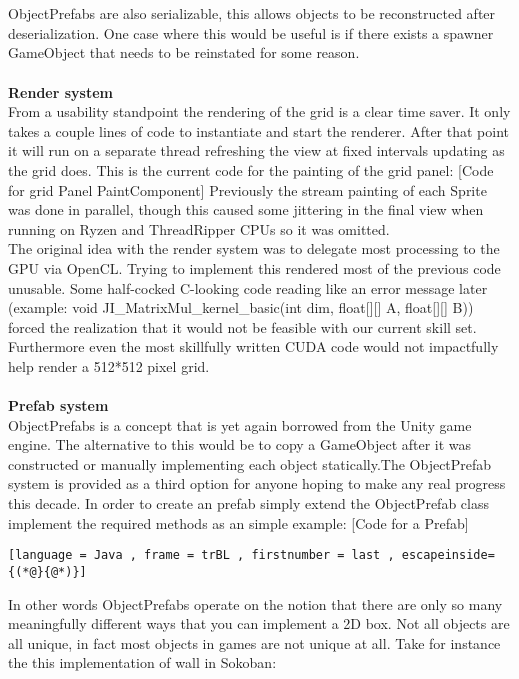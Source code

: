 \documentclass[main.tex]{subfiles}
\begin{document}
\\ \\
ObjectPrefabs are also serializable, this allows objects to be reconstructed after deserialization. One case where this would be useful is if there exists a spawner GameObject that needs to be reinstated for some reason. 
\\ \\
\textbf{Render system} \\%
From a usability standpoint the rendering of the grid is a clear time saver. It only takes a couple lines of code to instantiate and start the renderer. After that point it will run on a separate thread refreshing the view at fixed intervals updating as the grid does. This is the current code for the painting of the grid panel:
	[Code for grid Panel PaintComponent]
Previously the stream painting of each Sprite was done in parallel, though this caused some jittering in the final view when running on Ryzen and ThreadRipper CPUs so it was omitted.
\\
The original idea with the render system was to delegate most processing to the GPU via OpenCL. Trying to implement this rendered most of the previous code unusable. Some half-cocked C-looking code reading like an error message later (example: void JI\_MatrixMul\_kernel\_basic(int dim, float[][] A, float[][] B){}) forced the realization that it would not be feasible with our current skill set. Furthermore even the most skillfully written CUDA code would not impactfully help render a 512*512 pixel grid.
\\ \\
\textbf{Prefab system} \\%
ObjectPrefabs is a concept that is yet again borrowed from the Unity game engine. 
The alternative to this would be to copy a GameObject after it was constructed or manually implementing each object statically.The ObjectPrefab system is provided as a third option for anyone hoping to make any real progress this decade. In order to create an prefab simply extend the ObjectPrefab class implement the required methods as an simple example:
[Code for a Prefab]
\begin{lstlisting}[language = Java , frame = trBL , firstnumber = last , escapeinside={(*@}{@*)}]

\end{lstlisting}
In other words ObjectPrefabs operate on the notion that there are only so many meaningfully different ways that you can implement a 2D box. Not all objects are all unique, in fact most objects in games are not unique at all. Take for instance the this implementation of wall in Sokoban: 
\end{document}
